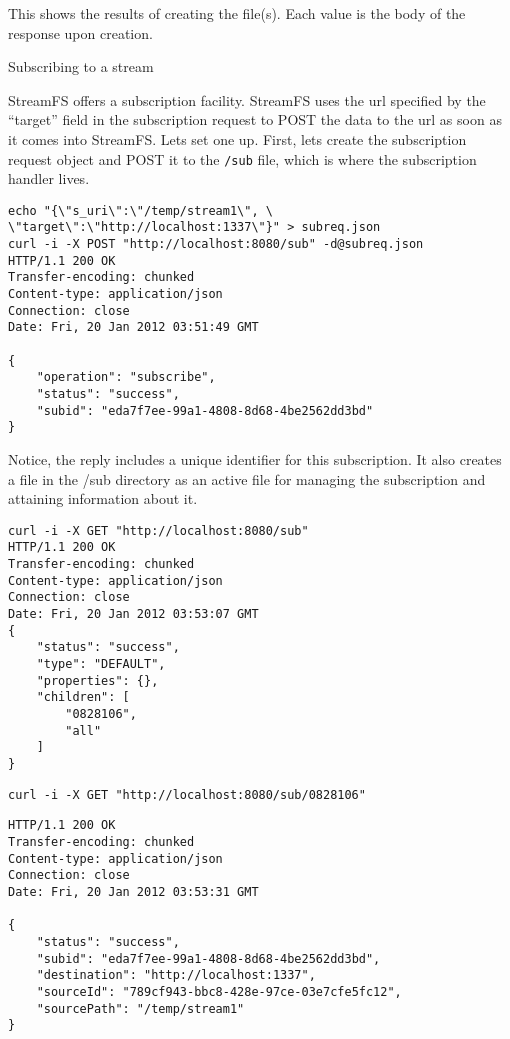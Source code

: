 This shows the results of creating the file(s). Each value is the body of the response upon creation.

Subscribing to a stream

StreamFS offers a subscription facility. StreamFS uses the url specified by the ``target'' field in the subscription request to POST the data to the url as soon as it comes into StreamFS. Lets set one up. First, lets create the subscription request object and POST it to the \texttt{/sub} file, which is where the subscription handler lives.

\begin{lstlisting}
echo "{\"s_uri\":\"/temp/stream1\", \
\"target\":\"http://localhost:1337\"}" > subreq.json
curl -i -X POST "http://localhost:8080/sub" -d@subreq.json 
HTTP/1.1 200 OK
Transfer-encoding: chunked
Content-type: application/json
Connection: close
Date: Fri, 20 Jan 2012 03:51:49 GMT

{
    "operation": "subscribe",
    "status": "success",
    "subid": "eda7f7ee-99a1-4808-8d68-4be2562dd3bd"
}
\end{lstlisting}

Notice, the reply includes a unique identifier for this subscription. It also creates a file in the /sub directory as an active file for managing the subscription and attaining information about it.

\begin{lstlisting}
curl -i -X GET "http://localhost:8080/sub"
HTTP/1.1 200 OK
Transfer-encoding: chunked
Content-type: application/json
Connection: close
Date: Fri, 20 Jan 2012 03:53:07 GMT
{
    "status": "success",
    "type": "DEFAULT",
    "properties": {},
    "children": [
        "0828106",
        "all"
    ]
}
\end{lstlisting}

\begin{lstlisting}
curl -i -X GET "http://localhost:8080/sub/0828106"
\end{lstlisting}

\begin{lstlisting}
HTTP/1.1 200 OK
Transfer-encoding: chunked
Content-type: application/json
Connection: close
Date: Fri, 20 Jan 2012 03:53:31 GMT

{
    "status": "success",
    "subid": "eda7f7ee-99a1-4808-8d68-4be2562dd3bd",
    "destination": "http://localhost:1337",
    "sourceId": "789cf943-bbc8-428e-97ce-03e7cfe5fc12",
    "sourcePath": "/temp/stream1"
}
\end{lstlisting}

